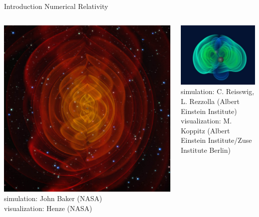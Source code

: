 \documentclass[xcolor=dvipsnames]{beamer}
\begin{document}
	\begin{frame}{Introduction}
		Numerical Relativity
		\begin{columns}[c]
			\column{2in}
			\begin{center}
				\includegraphics[scale=0.07]{nr-baker.jpg}\\
				\tiny{simulation: John Baker (NASA)}\\
				\tiny{visualization: Henze (NASA)}
			\end{center}
			\column{2in}
			\begin{center}
				\includegraphics[scale=0.5]{nr-mpg.jpg}\\
				\tiny{simulation: C. Reisswig, L. Rezzolla (Albert Einstein Institute)}\\
				\tiny{visualization: M. Koppitz (Albert Einstein Institute/Zuse Institute Berlin)}
			\end{center}
		\end{columns}		
	\end{frame}
\end{document}
